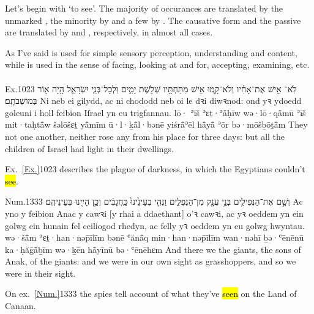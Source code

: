 \begin{paper}
	{\click} Let’s begin with  ‘to see’. The majority of occurances are translated by the unmarked , the minority by  and a few by . The causative form  and the passive  are translated by  and , respectively, in almost all cases.

	As I’ve said  is used for simple sensory perception, understanding and content, while  is used in the sense of facing, looking at and for, accepting, examining, etc.
\end{paper}


\paragraph{}


\begin{example}{Ex.}{10}{23}{}{}
	\quoling
	{לֹֽא־ אִ֣ישׁ אֶת־אָחִ֗יו וְלֹא־קָ֛מוּ אִ֥ישׁ מִתַּחְתָּ֖יו שְׁלֹ֣שֶׁת יָמִ֑ים וּֽלְכָל־בְּנֵ֧י יִשְׂרָאֵ֛ל הָ֥יָה א֖וֹר בְּמוֹשְׁבֹתָֽם׃}
	{Ni  neb ei gilydd, ac ni chododd neb oi le dꝛi diwꝛnod: ond yꝛ ydoedd goleuni i holl feibion Iſrael yn eu trigfannau.}
	{lō· ʾīš ʾɛṯ·ʾå̄ḥīw wə·lō·qå̄mū ʾīš mit·taḥtå̄w šəlōšɛṯ yå̄mīm ū·l·ḵå̄l·bənē yiśrå̄ʾēl hå̄yå̄ ʾōr bə·mōšḇōṯå̄m}
	{They  not one another, neither rose any from his place for three days: but all the children of Israel had light in their dwellings.}
\end{example}
\begin{paper}
	\explain Ex.~\vref{Ex.}{10}{23}{} describes the plague of darkness, in which the Egyptians couldn’t \hl{see}.
\end{paper}

\begin{example}{Num.}{13}{33}{}{}
	\quoling
	{וְשָׁ֣ם  אֶת־הַנְּפִילִ֛ים בְּנֵ֥י עֲנָ֖ק מִן־הַנְּפִלִ֑ים וַנְּהִ֤י בְעֵינֵ֙ינוּ֙ כַּֽחֲגָבִ֔ים וְכֵ֥ן הָיִ֖ינוּ בְּעֵינֵיהֶֽם׃}
	{Ac yno y  feibion Anac y cawꝛi [y rhai a ddaethant] o’ꝛ cawꝛi, ac yꝛ oeddem yn ein golwg ein hunain fel ceiliogod rhedyn, ac felly yꝛ oeddem yn eu golwg hwyntau.}
	{wə·šå̄m  ʾɛṯ·han·nəp̄īlīm bənē ʿănå̄q min·han·nəp̄īlīm wan·nəhī ḇə·ʿēnēnū ka·ḥăḡå̄ḇīm wə·ḵēn hå̄yīnū bə·ʿēnēhɛm}
	{And there we  the giants, the sons of Anak,  of the giants: and we were in our own sight as grasshoppers, and so we were in their sight.}
\end{example}
\begin{paper}
	\explain On ex.~\vref{Num.}{13}{33}{} the spies tell account of what they’ve \hl{seen} on the Land of Canaan.
\end{paper}



